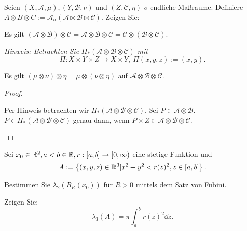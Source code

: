 \begin{Problem}
	Seien $(X,\mathcal{A},\mu),(Y,\mathcal{B},\nu)$ und $(Z,\mathcal{C},\eta)$ $\sigma$-endliche Maßraume. Definiere $A\otimes B\otimes C:=\mathcal{A}_{\sigma}(\mathcal{A}\boxtimes\mathcal{B}\boxtimes\mathcal{C})$. Zeigen Sie:
	\begin{parts}
		\item Es gilt $(\mathcal{A}\otimes \mathcal{B})\otimes \mathcal{C}=\mathcal{A}\otimes \mathcal{B}\otimes \mathcal{C}=\mathcal{C}\otimes (\mathcal{B}\otimes \mathcal{C})$.
			
			{\footnotesize \emph{Hinweis: Betrachten Sie} $\Pi_{*}(\mathcal{A}\otimes \mathcal{B}\otimes \mathcal{C})$ \emph{mit}
				\[
				\Pi:X\times Y\times Z\to X\times Y,~\Pi(x,y,z):=(x,y)
		.\]} 
			\item Es gilt $(\mu\otimes \nu)\otimes \eta=\mu\otimes(\nu\otimes\eta)$ auf $\mathcal{A}\otimes \mathcal{B}\otimes \mathcal{C}$.
	\end{parts}
\end{Problem}
\begin{proof}
	\begin{parts}
	\item Per Hinweis betrachten wir $\Pi_*(\mathcal{A}\otimes \mathcal{B}\otimes \mathcal{C})$. Sei $P\in \mathcal{A}\otimes \mathcal{B}$. $P\in \Pi_*(\mathcal{A}\otimes \mathcal{B}\otimes \mathcal{C})$ genau dann, wenn $P\times Z\in \mathcal{A}\otimes \mathcal{B}\otimes \mathcal{C}$.
	\end{parts}
\end{proof}
\begin{Problem}\label{pr:advanalblatt8-2}
	Sei $x_0\in \mathbb{R}^2,a<b\in \mathbb{R},r:[a,b]\to [0,\infty)$ eine stetige Funktion und
	\[
		A:=\left\{ (x,y,z)\in \mathbb{R}^3|x^2+y^2<r(z)^2,z\in [a,b] \right\} 
	.\] 
	\begin{parts}
	\item Bestimmen Sie $\lambda_2(B_R(x_0))$ f\"{u}r $R>0$ mittels dem Satz von Fubini.
	\item Zeigen Sie:
		\[
			\lambda_3(A)=\pi\int_a^b r(z)^2\dd{z}
		.\] 
	\end{parts}
\end{Problem}
